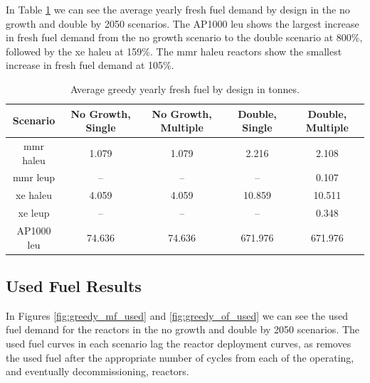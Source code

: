 In Table \ref{tab:greedy_fresh_avg} we can see the average yearly fresh fuel demand by design in the no growth and double by 2050 scenarios. The AP1000 \gls{leu} shows the largest increase in fresh fuel demand from the no growth scenario to the double scenario at 800\%, followed by the \gls{xe} \gls{haleu} at 159\%. The \gls{mmr} \gls{haleu} reactors show the smallest increase in fresh fuel demand at 105\%.


\begin{table}[H]
  \centering
  \caption{Average greedy yearly fresh fuel by design in tonnes.}
  \label{tab:greedy_fresh_avg}
  \begin{tabular}{c c c c c}
     \hline
     Scenario & No Growth, Single & No Growth, Multiple & Double, Single & Double, Multiple  \\
     \hline
     \gls{mmr} \gls{haleu}   & 1.079    & 1.079   & 2.216    & 2.108    \\
     \gls{mmr} \gls{leup}    & --       & --      & --       & 0.107    \\
     \gls{xe} \gls{haleu}    & 4.059    & 4.059   & 10.859   & 10.511   \\
     \gls{xe} \gls{leup}     & --       & --      & --       & 0.348    \\
     AP1000 \gls{leu}        & 74.636   & 74.636  & 671.976  & 671.976  \\
     \hline
  \end{tabular}
\end{table}



\subsection{Used Fuel Results}
\label{sec:greedy_used}

In Figures \ref{fig:greedy_mf_used} and \ref{fig:greedy_of_used} we can see the used fuel demand for the reactors in the no growth and double by 2050 scenarios. The used fuel curves in each scenario lag the reactor deployment curves, as \cyclus removes the used fuel after the appropriate number of cycles from  each of the operating, and eventually decommissioning, reactors.

